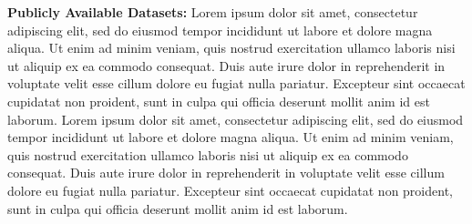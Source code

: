 \documentclass[12pt]{article}
\begin{document}
\textbf{Publicly Available Datasets:} Lorem ipsum dolor sit amet, consectetur adipiscing elit, sed do eiusmod tempor incididunt ut labore et dolore magna aliqua. Ut enim ad minim veniam, quis nostrud exercitation ullamco laboris nisi ut aliquip ex ea commodo consequat. Duis aute irure dolor in reprehenderit in voluptate velit esse cillum dolore eu fugiat nulla pariatur. Excepteur sint occaecat cupidatat non proident, sunt in culpa qui officia deserunt mollit anim id est laborum.
Lorem ipsum dolor sit amet, consectetur adipiscing elit, sed do eiusmod tempor incididunt ut labore et dolore magna aliqua. Ut enim ad minim veniam, quis nostrud exercitation ullamco laboris nisi ut aliquip ex ea commodo consequat. Duis aute irure dolor in reprehenderit in voluptate velit esse cillum dolore eu fugiat nulla pariatur. Excepteur sint occaecat cupidatat non proident, sunt in culpa qui officia deserunt mollit anim id est laborum.

\newpage %
\end{document}

